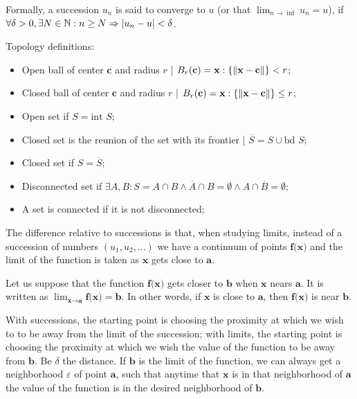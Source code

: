 \documentclass[0pt, a4paper]{article}
\begin{document}
Formally, a succession $u_n$ is said to converge to $u$ (or that $\lim_{n \rightarrow \inf} u_n =u$), if $\forall \delta>0, \exists N \in \mathbb{N}:n\geq N \Rightarrow \abs{u_n-u}<\delta$. 

Topology definitions:
\begin{itemize}
	\item Open ball of center $\textbf{c}$ and radius $r$ | $B_r(\textbf{c})=\textbf{x}:\{\norm{\textbf{x}-\textbf{c}}\}<r$;
	\item Closed ball of center $\textbf{c}$ and radius $r$ | $B_r(\textbf{c})=\textbf{x}:\{\norm{\textbf{x}-\textbf{c}}\}\leq r$;
	\item Open set if $S = \text{int }S$;
	\item Closed set is the reunion of the set with its frontier | $\overline{S}=S \cup \text{bd }S$;
	\item Closed set if $S = \overline{S}$;
	\item Disconnected set if $\exists A,B: S=A\cap B \wedge \overline{A}\cap B=\emptyset\wedge A \cap \overline{B}= \emptyset$;
	\item A set is connected if it is not disconnected;
\end{itemize}	

The difference relative to successions is that, when studying limits, instead of a succession of numbers $(u_1, u_2, \dots)$ we have a continuum of points $\textbf{f(x)}$ and the limit of the function is taken as $\textbf{x}$ gets close to $\textbf{a}$. 

Let us suppose that the function $\textbf{f(x)}$ gets closer to $\textbf{b}$ when $\textbf{x}$ nears $\textbf{a}$. It is written as $\lim_{\textbf{x}\to \textbf{a}} \textbf{f(x)}=\textbf{b}$. In other words, if $\textbf{x}$ is close to $\textbf{a}$, then $\textbf{f(x)}$ is near $\textbf{b}$.

With successions, the starting point is choosing the proximity at which we wish to to be away from the limit of the succession; with limits, the starting point is choosing the proximity at which we wish the value of the function to be away from $\textbf{b}$. Be $\delta$ the distance. If $\textbf{b}$ is the limit of the function, we can always get a neighborhood $\varepsilon$ of point $\textbf{a}$, such that anytime that $\textbf{x}$ is in that neighborhood of $\textbf{a}$ the value of the function is in the desired neighborhood of $\textbf{b}$.
\end{document}
